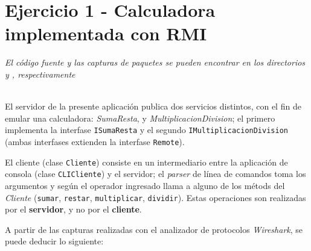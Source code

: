 






\clearpage
\tableofcontents
\clearpage 

\lstset{style=javastyle}

\section{Ejercicio 1 - Calculadora implementada con RMI}

\emph{El código fuente y las capturas de paquetes se pueden encontrar en los directorios  y , respectivamente} 

~\\

El servidor de la presente aplicación publica dos servicios distintos, con el fin de emular una calculadora: \emph{SumaResta}, y \emph{MultiplicacionDivision}; el primero implementa la interfase \texttt{ISumaResta} y el segundo \texttt{IMultiplicacionDivision} (ambas interfases extienden la interfase \texttt{Remote}). 

El cliente (clase \texttt{Cliente}) consiste en un intermediario entre la aplicación de consola (clase \texttt{CLICliente}) y el servidor; el \emph{parser} de línea de comandos toma los argumentos y según el operador ingresado llama a alguno de los métods del \emph{Cliente} (\texttt{sumar}, \texttt{restar}, \texttt{multiplicar}, \texttt{dividir}). Estas operaciones son realizadas por el \textbf{servidor}, y no por el \textbf{cliente}.

A partir de las capturas realizadas con el analizador de protocolos \emph{Wireshark}, se puede deducir lo siguiente:

